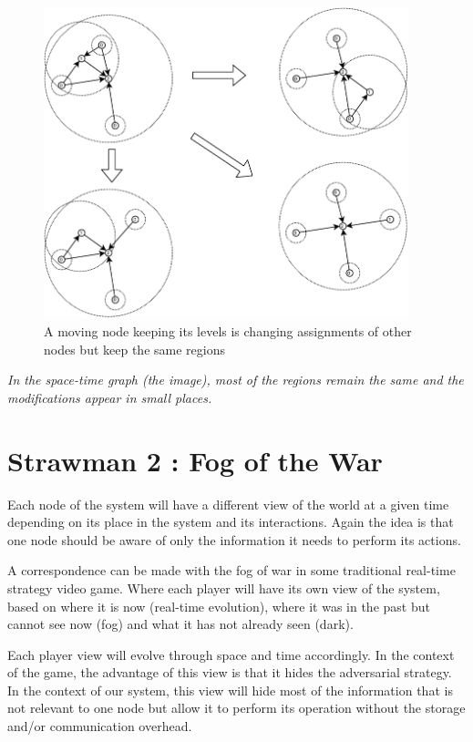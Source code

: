 \documentclass[a4paper,11pt,oneside]{report}
\begin{document}
\begin{figure}[!h] 
\centering
\includegraphics[width=300pt]{figures/LocarnoTreaties_movingnode}
\caption{A moving node keeping its levels is changing assignments of other nodes but keep the same regions}
\label{fig:LocarnoTreaties_movingnode}
\end{figure}

\textit{In the space-time graph (the image), most of the regions remain the same and
the modifications appear in small places.}

\section{Strawman 2 : Fog of the War}

Each node of the system will have a different view of the world at a given time
depending on its place in the system and its interactions. Again the idea is
that one node should be aware of only the information it needs to perform its
actions. 

A correspondence can be made with the fog of war in some traditional real-time
strategy video game. Where each player will have its own view of the system,
based on where it is now (real-time evolution), where it was in the past but
cannot see now (fog) and what it has not already seen (dark).

Each player view will evolve through space and time accordingly. In the context
of the game, the advantage of this view is that it hides the adversarial
strategy. In the context of our system, this view will hide most of the
information that is not relevant to one node but allow it to perform its
operation without the storage and/or communication overhead. 
\end{document}
